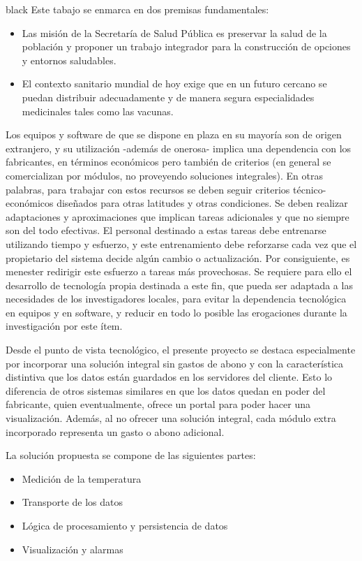 \documentclass[11pt]{charter}
\begin{document}
\begin{consigna}{black}
Este tabajo se enmarca en dos premisas fundamentales:
\begin{itemize}
\item Las misión de la Secretaría de Salud Pública es preservar la salud de la población y proponer un trabajo integrador para la construcción de opciones y entornos saludables.
\item El contexto sanitario mundial de hoy exige que en un futuro cercano se puedan distribuir adecuadamente y de manera segura especialidades medicinales tales como las vacunas.
\end{itemize}
Los equipos y software de que se dispone en plaza en su mayoría son de origen extranjero, y su utilización -además de onerosa- implica una dependencia con los fabricantes, en términos económicos pero también de criterios (en general se comercializan por módulos, no proveyendo soluciones integrales). En otras palabras, para trabajar con estos recursos se deben seguir criterios técnico-económicos diseñados para otras latitudes y otras condiciones. Se deben realizar adaptaciones y aproximaciones que implican tareas adicionales y que no siempre son del todo efectivas. El personal destinado a estas tareas debe entrenarse utilizando tiempo y esfuerzo, y este entrenamiento debe reforzarse cada vez que el propietario del sistema decide algún cambio o actualización. Por consiguiente, es menester redirigir este esfuerzo a tareas más provechosas.
Se requiere para ello el desarrollo de tecnología propia destinada a este fin, que pueda ser adaptada a las necesidades de los investigadores locales, para evitar la dependencia tecnológica en equipos y en software, y reducir en todo lo posible las erogaciones durante la investigación por este ítem.

Desde el punto de vista tecnológico, el presente proyecto se destaca especialmente por incorporar una solución integral sin gastos de abono y con la característica distintiva que los datos están guardados en los servidores del cliente. Esto lo diferencia de otros sistemas similares en que los datos quedan en poder del fabricante, quien eventualmente, ofrece un portal para poder hacer una visualización. Además, al no ofrecer una solución integral, cada módulo extra incorporado representa un gasto o abono adicional. 

La solución propuesta se compone de las siguientes partes:
\begin{itemize}
\item Medición de la temperatura
\item Transporte de los datos
\item Lógica de procesamiento y persistencia de datos
\item Visualización y alarmas
\end{itemize}



\end{consigna}
\end{document}
